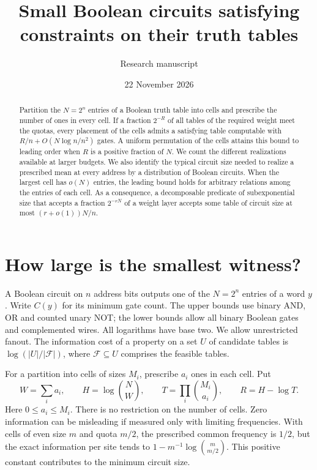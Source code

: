 \documentclass[11pt]{article}
\title{Small Boolean circuits satisfying constraints on their truth tables}
\author{Research manuscript}
\date{22 November 2026}
\begin{document}
\maketitle
\begin{abstract}
Partition the $N=2^n$ entries of a Boolean truth table into cells and prescribe the number of ones in every cell. If a fraction $2^{-R}$ of all tables of the required weight meet the quotas, every placement of the cells admits a satisfying table computable with $R/n+O(N\log n/n^2)$ gates. A uniform permutation of the cells attains this bound to leading order when $R$ is a positive fraction of $N$. We count the different realizations available at larger budgets. We also identify the typical circuit size needed to realize a prescribed mean at every address by a distribution of Boolean circuits. When the largest cell has $o(N)$ entries, the leading bound holds for arbitrary relations among the entries of each cell. As a consequence, a decomposable predicate of subexponential size that accepts a fraction $2^{-rN}$ of a weight layer accepts some table of circuit size at most $(r+o(1))N/n$.
\end{abstract}
\section{How large is the smallest witness?}
A Boolean circuit on $n$ address bits outputs one of the $N=2^n$ entries of a word $y$. Write $C(y)$ for its minimum gate count. The upper bounds use binary AND, OR and counted unary NOT; the lower bounds allow all binary Boolean gates and complemented wires. All logarithms have base two. We allow unrestricted fanout. The information cost of a property on a set $U$ of candidate tables is $\log(|U|/|\mathcal F|)$, where $\mathcal F\subseteq U$ comprises the feasible tables.

For a partition into cells of sizes $M_i$, prescribe $a_i$ ones in each cell. Put
\[
 W=\sum_i a_i,\qquad H=\log\binom NW,\qquad
 T=\prod_i\binom{M_i}{a_i},\qquad R=H-\log T.
\]
Here $0\le a_i\le M_i$. There is no restriction on the number of cells. Zero information can be misleading if measured only with limiting frequencies. With cells of even size $m$ and quota $m/2$, the prescribed common frequency is $1/2$, but the exact information per site tends to $1-m^{-1}\log\binom{m}{m/2}$. This positive constant contributes to the minimum circuit size.
\end{document}
